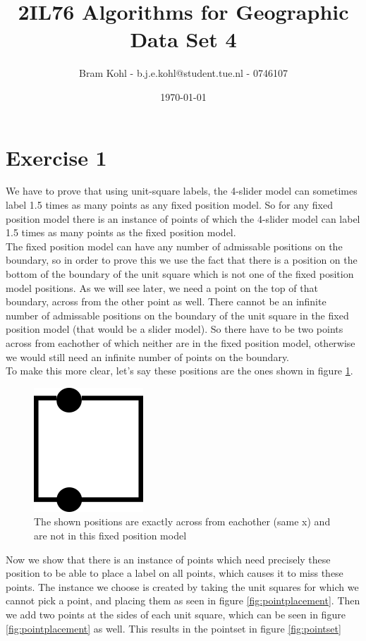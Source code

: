 \documentclass[a4paper,11pt]{article}
\title{
	2IL76 Algorithms for Geographic Data Set 4 \\
}
\author{
	Bram Kohl - b.j.e.kohl@student.tue.nl - 0746107
}
\date{\today}
\begin{document}
	\maketitle
	
\section*{Exercise 1}
We have to prove that using unit-square labels, the 4-slider model can sometimes label 1.5 times as many points as any fixed position model. So for any fixed position model there is an instance of points of which the 4-slider model can label 1.5 times as many points as the fixed position model.\\

The fixed position model can have any number of admissable positions on the boundary, so in order to prove this we use the fact that there is a position on the bottom of the boundary of the unit square which is not one of the fixed position model positions. As we will see later, we need a point on the top of that boundary, across from the other point as well. There cannot be an infinite number of admissable positions on the boundary of the unit square in the fixed position model (that would be a slider model). So there have to be two points across from eachother of which neither are in the fixed position model, otherwise we would still need an infinite number of points on the boundary.\\
To make this more clear, let's say these positions are the ones shown in figure \ref{fig:notinmodel}.\\


\begin{figure}[H]
	\centering
	\includegraphics[scale=0.3]{4-1.png}
	\caption{The shown positions are exactly across from eachother (same x) and are not in this fixed position model}
	\label{fig:notinmodel}
\end{figure}

Now we show that there is an instance of points which need precisely these position to be able to place a label on all points, which causes it to miss these points. The instance we choose is created by taking the unit squares for which we cannot pick a point, and placing them as seen in figure \ref{fig:pointplacement}. Then we add two points at the sides of each unit square, which can be seen in figure \ref{fig:pointplacement} as well. This results in the pointset in figure \ref{fig:pointset}
\end{document}
